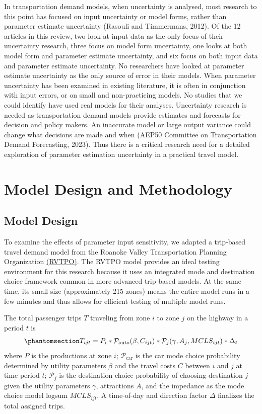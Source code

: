 \documentclass[
  futuretransp,
  submit,
  moreauthors,
]{Definitions/mdpi}
\begin{document}
In transportation demand models, when uncertainty is analysed, most
research to this point has focused on input uncertainty or model forms,
rather than parameter estimate uncertainty (Rasouli and Timmermans,
2012). Of the 12 articles in this review, two look at input data as the
only focus of their uncertainty research, three focus on model form
uncertainty, one looks at both model form and parameter estimate
uncertainty, and six focus on both input data and parameter estimate
uncertainty. No researchers have looked at parameter estimate
uncertainty as the only source of error in their models. When parameter
uncertainty has been examined in existing literature, it is often in
conjunction with input errors, or on small and non-practicing models. No
studies that we could identify have used real models for their analyses.
Uncertainty research is needed as transportation demand models provide
estimates and forecasts for decision and policy makers. An inaccurate
model or large output variance could change what decisions are made and
when (AEP50 Committee on Transportation Demand Forecasting, 2023). Thus
there is a critical research need for a detailed exploration of
parameter estimation uncertainty in a practical travel model.


\section{Model Design and Methodology}\label{sec-methods}

\subsection{Model Design}\label{model-design}

To examine the effects of parameter input sensitivity, we adapted a
trip-based travel demand model from the Roanoke Valley Transportation
Planning Organization
\href{https://github.com/xinwangvdot/rvtpo}{(RVTPO)}. The RVTPO model
provides an ideal testing environment for this research because it uses
an integrated mode and destination choice framework common in more
advanced trip-based models. At the same time, its small size
(approximately 215 zones) means the entire model runs in a few minutes
and thus allows for efficient testing of multiple model runs.

The total passenger trips \(T\) traveling from zone \(i\) to zone \(j\)
on the highway in a period \(t\) is
\begin{equation}\phantomsection\label{eq-trips}{
T_{ijt} = P_i * \mathcal{P}_{\mathrm{auto}}(\beta, C_{ijt}) * \mathcal{P}_j(\gamma, A_j, MCLS_{ijt}) * \Delta_t 
}\end{equation} where \(P\) is the productions at zone \(i\);
\(\mathcal{P}_{\mathrm{car}}\) is the car mode choice probability
determined by utility parameters \(\beta\) and the travel costs \(C\)
between \(i\) and \(j\) at time period \(t\); \(\mathcal{P}_{j}\) is the
destination choice probability of choosing destination \(j\) given the
utility parameters \(\gamma\), attractions \(A\), and the impedance as
the mode choice model logsum \(MCLS_{ijt}\). A time-of-day and direction
factor \(\Delta\) finalizes the total assigned trips.
\end{document}
